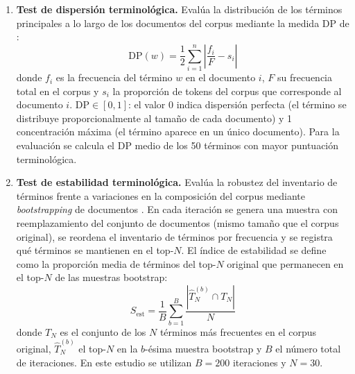 \begin{enumerate}
    \item \textbf{Test de dispersión terminológica.}
    Evalúa la distribución de los términos principales a lo largo de los
    documentos del corpus mediante la medida $\mathrm{DP}$ de
    \textcite{gries2021dispersion}:
    \begin{equation}
        \mathrm{DP}(w) = \frac{1}{2}\sum_{i=1}^{n}
        \left|\frac{f_i}{F} - s_i\right|
        \label{eq:dp}
    \end{equation}
    donde $f_i$ es la frecuencia del término $w$ en el documento $i$,
    $F$ su frecuencia total en el corpus y $s_i$ la proporción de tokens
    del corpus que corresponde al documento $i$. $\mathrm{DP} \in [0,1]$:
    el valor 0 indica dispersión perfecta (el término se distribuye
    proporcionalmente al tamaño de cada documento) y 1 concentración máxima
    (el término aparece en un único documento). Para la evaluación se
    calcula el $\mathrm{DP}$ medio de los 50 términos con mayor puntuación
    terminológica.

    \item \textbf{Test de estabilidad terminológica.}
    Evalúa la robustez del inventario de términos frente a variaciones en la
    composición del corpus mediante \textit{bootstrapping} de documentos
    \autocite{efron1994introduction}. En cada iteración se genera una muestra con
    reemplazamiento del conjunto de documentos (mismo tamaño que el corpus
    original), se reordena el inventario de términos por frecuencia y se
    registra qué términos se mantienen en el top-$N$. El índice de estabilidad
    se define como la proporción media de términos del top-$N$ original
    que permanecen en el top-$N$ de las muestras bootstrap:
    \begin{equation}
        S_{\mathrm{est}} = \frac{1}{B}\sum_{b=1}^{B}
        \frac{|\hat{T}^{(b)}_N \cap T_N|}{N}
        \label{eq:estabilidad}
    \end{equation}
    donde $T_N$ es el conjunto de los $N$ términos más frecuentes en el corpus
    original, $\hat{T}^{(b)}_N$ el top-$N$ en la $b$-ésima muestra bootstrap
    y $B$ el número total de iteraciones. En este estudio se utilizan
    $B = 200$ iteraciones y $N = 30$.

\end{enumerate}

